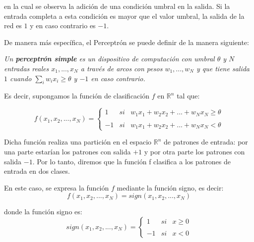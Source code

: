 \documentclass[a4paper, 11pt]{article} %
\begin{document}
en la cual se observa la adición de una condición umbral en la salida. Si la entrada completa a esta condición es mayor que el valor umbral, la salida de la red es $1$ y en caso contrario es $-1$.

De manera más específica, el Perceptrón se puede definir de la manera siguiente:

\textit{Un \textbf{perceptrón simple} es un dispositivo de computación con umbral $\theta$ y $N$ entradas reales $x_1, ..., x_N$ a través de arcos con pesos $w_1, ..., w_N$ y que tiene salida $1$ cuando $\sum_{i}w_ix_i \geq \theta$ y $-1$ en caso contrario.}

Es decir, supongamos la función  de clasificación $f$ en $\mathbb{R}^n$ tal que:

\[
f(x_1, x_2, ..., x_N) = \left\{ \begin{array}{lcc}
             1 &   si  & w_1x_1 + w_2x_2 + ... + w_Nx_N \geq \theta \\
             \\ -1 &  si  &  w_1x_1 + w_2x_2 + ... + w_Nx_N < \theta
             \end{array}
   \right.
\]

Dicha función realiza una partición en el espacio $\mathbb{R}^n$ de patrones de entrada: por una parte estarían los patrones con salida $+1$ y por otra parte los patrones con salida $- 1$. Por lo tanto, diremos que la función f clasifica a los patrones de entrada en dos clases.

En este caso, se expresa la función $f$ mediante la función signo, es decir:
\[
f(x_1, x_2, ..., x_N) = sign(x_1, x_2, ..., x_N)
\]

donde la función signo es:
\[
sign(x_1, x_2, ..., x_N) = \left\{ \begin{array}{lcc}
             1 &   si  & x \geq 0 \\
             \\ -1 &  si  &  x < 0
             \end{array}
   \right.
\]
\end{document}

